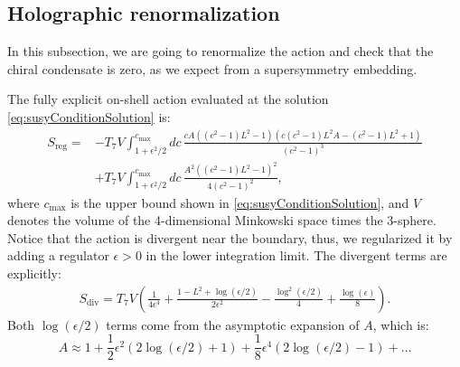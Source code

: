 \subsection{Holographic renormalization}
In this subsection, we are going to renormalize the action and check that the chiral condensate is zero, as we expect from a supersymmetry embedding.

The fully explicit on-shell action evaluated at the solution \eqref{eq:susyConditionSolution} is:
\begin{align}\label{eq:ActionAtSolution}
 S_\text{reg} = & -T_7 V \int_{1 + \epsilon^2/2}^{c_\text{max}} d c \, 
 \frac{c A \left(\left(c^2-1\right) L^2-1\right) \left(c \left(c^2-1\right) L^2 A-\left(c^2-1\right) L^2+1\right)}{\left(c^2-1\right)^3}
 \nonumber \\
     & +T_7 V \int_{1 + \epsilon^2/2}^{c_\text{max}} d c  \, 
 \frac{A^2 \left(\left(c^2-1\right) L^2-1\right)^2}{4 \left(c^2-1\right)^2},
\end{align}
where $c_\text{max}$ is the upper bound shown in \eqref{eq:susyConditionSolution}, and $V$ denotes the volume of the 4-dimensional Minkowski space times the 3-sphere. Notice that the action is divergent near the boundary, thus, we regularized it by adding a regulator $\epsilon>0$ in the lower integration limit. The divergent terms are explicitly:
\begin{align} \label{eq:Sdiv}
 S_\text{div} = T_7 V 
        \left( \frac{1}{4 \epsilon ^4} +\frac{1-L^2+\log \left(\epsilon/2\right)}{2 \epsilon ^2}-\frac{ \log ^2\left(\epsilon/2\right)}{4}+\frac{\log (\epsilon )}{8} \right).
\end{align}
Both $\log(\epsilon/2)$ terms come from the asymptotic expansion of $A$, which is:
\begin{equation}
 A \approx 1 +\frac{1}{2} \epsilon^2 (2 \log (\epsilon/2)+1) + \frac{1}{8} \epsilon^4 (2 \log(\epsilon/2)-1) + \ldots
\end{equation}


